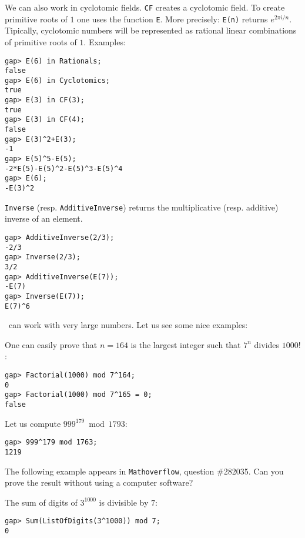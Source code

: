 We can also work in cyclotomic fields.  \lstinline{CF} creates a cyclotomic
field. To create primitive roots of $1$ one uses the function \lstinline{E}.
More precisely: \lstinline{E(n)} returns $e^{2\pi i/n}$. Tipically, cyclotomic
numbers will be represented as rational linear combinations of primitive roots
of $1$. Examples:
\begin{lstlisting}
gap> E(6) in Rationals;
false 
gap> E(6) in Cyclotomics;
true
gap> E(3) in CF(3);
true
gap> E(3) in CF(4);
false
gap> E(3)^2+E(3);
-1
gap> E(5)^5-E(5);
-2*E(5)-E(5)^2-E(5)^3-E(5)^4
gap> E(6);
-E(3)^2
\end{lstlisting}
\lstinline{Inverse} (resp. \lstinline{AdditiveInverse}) returns 
the multiplicative (resp. additive) inverse of an element. 
\begin{lstlisting}
gap> AdditiveInverse(2/3);
-2/3
gap> Inverse(2/3);
3/2
gap> AdditiveInverse(E(7));
-E(7)
gap> Inverse(E(7));
E(7)^6
\end{lstlisting}

\GAP~can work with very large numbers. 
Let us see some nice examples:

\begin{example}
	One can easily prove that $n=164$ is the largest integer such that $7^n$
	divides $1000!$:
\begin{lstlisting}
gap> Factorial(1000) mod 7^164;
0
gap> Factorial(1000) mod 7^165 = 0;
false
\end{lstlisting}
\end{example}

\begin{example}
Let us compute $999^{179}\bmod 1793$:
\begin{lstlisting}
gap> 999^179 mod 1763;
1219
\end{lstlisting}
\end{example}

The following example appears in \texttt{Mathoverflow}, question \#282035. Can you prove
the result without using a computer software?

\begin{example}
	The sum of digits of $3^{1000}$ is divisible by $7$: %
\begin{lstlisting}
gap> Sum(ListOfDigits(3^1000)) mod 7;
0
\end{lstlisting}
\end{example}

